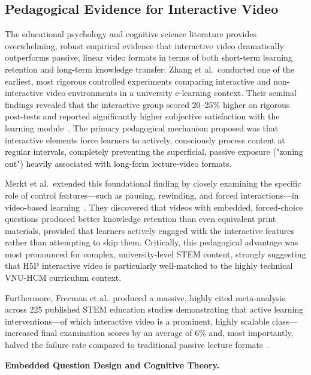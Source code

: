 \subsection{Pedagogical Evidence for Interactive Video}

The educational psychology and cognitive science literature provides overwhelming, robust empirical evidence that interactive video dramatically outperforms passive, linear video formats in terms of both short-term learning retention and long-term knowledge transfer. Zhang et al.\ conducted one of the earliest, most rigorous controlled experiments comparing interactive and non-interactive video environments in a university e-learning context. Their seminal findings revealed that the interactive group scored 20--25\% higher on rigorous post-tests and reported significantly higher subjective satisfaction with the learning module~\cite{zhang2006}. The primary pedagogical mechanism proposed was that interactive elements force learners to actively, consciously process content at regular intervals, completely preventing the superficial, passive exposure ("zoning out") heavily associated with long-form lecture-video formats.

Merkt et al.\ extended this foundational finding by closely examining the specific role of control features—such as pausing, rewinding, and forced interactions—in video-based learning~\cite{merkt2011}. They discovered that videos with embedded, forced-choice questions produced better knowledge retention than even equivalent print materials, provided that learners actively engaged with the interactive features rather than attempting to skip them. Critically, this pedagogical advantage was most pronounced for complex, university-level STEM content, strongly suggesting that H5P interactive video is particularly well-matched to the highly technical VNU-HCM curriculum context.

Furthermore, Freeman et al.\ produced a massive, highly cited meta-analysis across 225 published STEM education studies demonstrating that active learning interventions---of which interactive video is a prominent, highly scalable class---increased final examination scores by an average of 6\% and, most importantly, halved the failure rate compared to traditional passive lecture formats~\cite{freeman2014}.

\textbf{Embedded Question Design and Cognitive Theory.}

